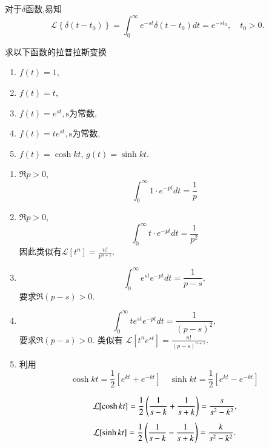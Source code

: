 对于$\delta$函数,易知
$$
\mathcal{L}\left\{\delta\left(t-t_0\right)\right\}=\int_0^{\infty} e^{-s t} \delta\left(t-t_0\right) d t=e^{-s t_0},  \quad t_0>0 .
$$
\begin{examplebox}{求以下函数的拉普拉斯变换
    \begin{enumerate}
        \item $f(t) = 1$,
        \item $f(t) = t$,
        \item $f(t) =e^{s t}, \textrm{s为常数}$,
        \item $f(t) = t e^{s t}, \textrm{s为常数}$,
        \item $f(t) = \cosh {k t}$, $g(t)= \sinh {kt}$.
    \end{enumerate}}

    \begin{enumerate}
        \item $\Re p > 0$, 
            $$\int_{0}^{\infty} 1 \cdot e^{-p t} dt = \frac{1}{p}$$
        \item  $\Re p > 0$, 
            $$\int_{0}^{\infty} t \cdot e^{-p t} dt = \frac{1}{p^2}$$
            因此类似有$\mathcal{L}[t^n] = \frac{n!}{p^{n+1}}$.
        \item $$
            \int_{0}^{\infty} e^{s t} e^{-p t} dt = \frac{1}{p-s} , 
        $$
        要求$\Re (p-s) > 0$.
        \item 
        $$
        \int_{0}^{\infty} t e^{s t} e^{-p t} dt = \frac{1}{(p-s)^2} ,
        $$
        要求$\Re (p-s) > 0$.  
    类似有 $\mathcal{L}[t^n e^{s t}] = \frac{n!}{(p-s)^{n+1}}$.
        \item 利用
        $$
         \cosh{k t}  = \frac{1}{2} \left[ e^{kt} + e^{-kt}\right] \quad 
         \sinh{k t}  = \frac{1}{2} \left[ e^{kt} - e^{-kt}\right] 
        $$

        $$
        \mathcal{L}[ \cosh{k t} ] = {\frac{1}{2}} \left( \frac{1}{s-k} + \frac{1}{s+k} \right) = \frac{s}{s^2 - k^2} ,
        $$
        $$
        \mathcal{L}[ \sinh{k t} ] = {\frac{1}{2}} \left( \frac{1}{s-k} - \frac{1}{s+k} \right) = \frac{k}{s^2 - k^2} .
        $$
    \end{enumerate}
\end{examplebox}

